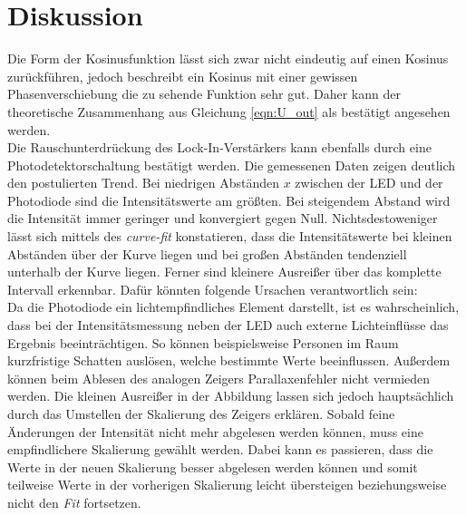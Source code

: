 %

%
\section{Diskussion}
\label{sec:Diskussion}
Die Form der Kosinusfunktion lässt sich zwar nicht eindeutig auf einen Kosinus zurückführen, jedoch beschreibt 
ein Kosinus mit einer gewissen Phasenverschiebung die zu sehende Funktion sehr gut. Daher kann der theoretische 
Zusammenhang aus Gleichung \eqref{eqn:U_out} als bestätigt angesehen werden.\\
\noindent
Die Rauschunterdrückung des Lock-In-Verstärkers kann ebenfalls durch eine Photodetektorschaltung bestätigt werden.
Die gemessenen Daten zeigen deutlich den postulierten Trend. Bei niedrigen Abständen $x$ zwischen der LED und 
der Photodiode sind die Intensitätswerte am größten. Bei steigendem Abstand wird die Intensität immer geringer 
und konvergiert gegen Null.
Nichtsdestoweniger lässt sich mittels des \emph{curve-fit} konstatieren, dass die Intensitätswerte bei kleinen 
Abständen über der Kurve liegen und bei großen Abständen tendenziell unterhalb der Kurve liegen. Ferner sind 
kleinere Ausreißer über das komplette Intervall erkennbar. Dafür könnten folgende Ursachen verantwortlich sein:\\
Da die Photodiode ein lichtempfindliches Element darstellt, ist es wahrscheinlich, dass bei der Intensitätsmessung
neben der LED auch externe Lichteinflüsse das Ergebnis beeinträchtigen. So können beispielsweise Personen im Raum 
kurzfristige Schatten auslösen, welche bestimmte Werte beeinflussen. Außerdem können beim Ablesen des analogen 
Zeigers Parallaxenfehler nicht vermieden werden. Die kleinen Ausreißer in der Abbildung lassen sich jedoch 
hauptsächlich durch das Umstellen der Skalierung des Zeigers erklären. Sobald feine Änderungen der Intensität nicht 
mehr abgelesen werden können, muss eine empfindlichere Skalierung gewählt werden. Dabei kann es passieren, dass die 
Werte in der neuen Skalierung besser abgelesen werden können und somit teilweise Werte in der vorherigen Skalierung
leicht übersteigen beziehungsweise nicht den \emph{Fit} fortsetzen. 
%
